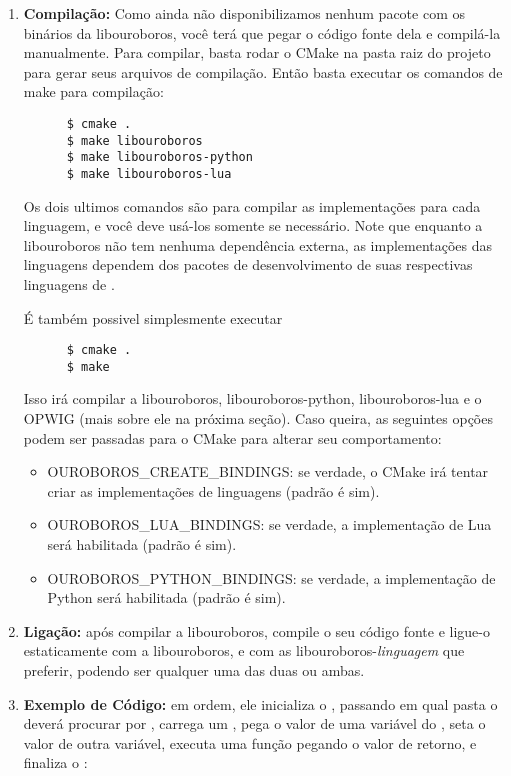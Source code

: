 \begin{enumerate}
  \item \textbf{Compilação:} Como ainda não disponibilizamos nenhum pacote
    com os binários da libouroboros, você terá que pegar o código fonte dela
    e compilá-la manualmente. Para compilar, basta rodar o CMake na pasta 
    raiz do projeto para gerar seus arquivos de compilação. Então basta 
    executar os comandos de make para compilação:
    \begin{verbatim}
      $ cmake .
      $ make libouroboros
      $ make libouroboros-python
      $ make libouroboros-lua
    \end{verbatim}
    Os dois ultimos comandos são para compilar as implementações para cada linguagem,
    e você deve usá-los somente se necessário. Note que enquanto a libouroboros não
    tem nenhuma dependência externa, as implementações das linguagens dependem dos
    pacotes de desenvolvimento de suas respectivas linguagens de \script{}.
    
    É também possivel simplesmente executar
    \begin{verbatim}
      $ cmake .
      $ make
    \end{verbatim}
    Isso irá compilar a libouroboros, libouroboros-python, libouroboros-lua e o OPWIG
    (mais sobre ele na próxima seção). Caso queira, as seguintes opções podem ser
    passadas para o CMake para alterar seu comportamento:
    \begin{itemize}
      \item OUROBOROS\_CREATE\_BINDINGS: se verdade, o CMake irá tentar criar as 
        implementações de linguagens (padrão é sim).
      \item OUROBOROS\_LUA\_BINDINGS: se verdade, a implementação de Lua será habilitada (padrão é sim).
      \item OUROBOROS\_PYTHON\_BINDINGS: se verdade, a implementação de Python será habilitada (padrão é sim).
    \end{itemize}
    
  \item \textbf{Ligação:} após compilar a libouroboros, compile o seu código fonte e ligue-o estaticamente
    com a libouroboros, e com as libouroboros-\textit{linguagem} que preferir, podendo ser qualquer uma
    das duas ou ambas.
    
  \item \textbf{Exemplo de Código:} em ordem, ele inicializa o \SMgr{}, passando em qual pasta
    o \SMgr{} deverá procurar por , carrega um \script{},
    pega o valor de uma variável do \script{}, seta o valor de outra variável, executa uma
    função pegando o valor de retorno, e finaliza o \SMgr{}:
    

\end{enumerate}
